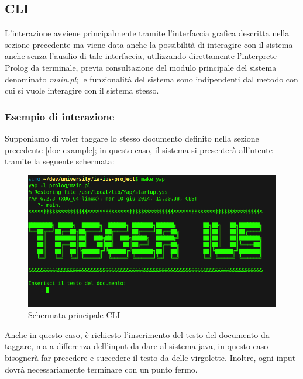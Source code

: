 \subsection{CLI}
L’interazione avviene principalmente tramite l'interfaccia grafica descritta nella sezione precedente ma viene data anche la possibilità di interagire con il sistema anche senza l'ausilio di tale interfaccia, utilizzando direttamente l'interprete Prolog da terminale, previa consultazione del modulo principale del sistema denominato \emph{main.pl}; le funzionalità del sistema sono indipendenti dal metodo con cui si vuole interagire con il sistema stesso.
\subsubsection{Esempio di interazione}
Supponiamo di voler taggare lo stesso documento definito nella sezione precedente \ref{doc-example}; in questo caso, il sistema si presenterà all'utente tramite la seguente schermata:

\begin{figure}[H]
	\includegraphics[width=1\textwidth]{img/interfaces/CLI-main.png}
	\caption[Schermata CLI main]{Schermata principale CLI}
	\label{CLI-main}
\end{figure}

Anche in questo caso, è richiesto l'inserimento del testo del documento da taggare, ma a differenza dell'input da dare al sistema java, in questo caso bisognerà far precedere e succedere il testo da delle virgolette.
Inoltre, ogni input dovrà necessariamente terminare con un punto fermo.

